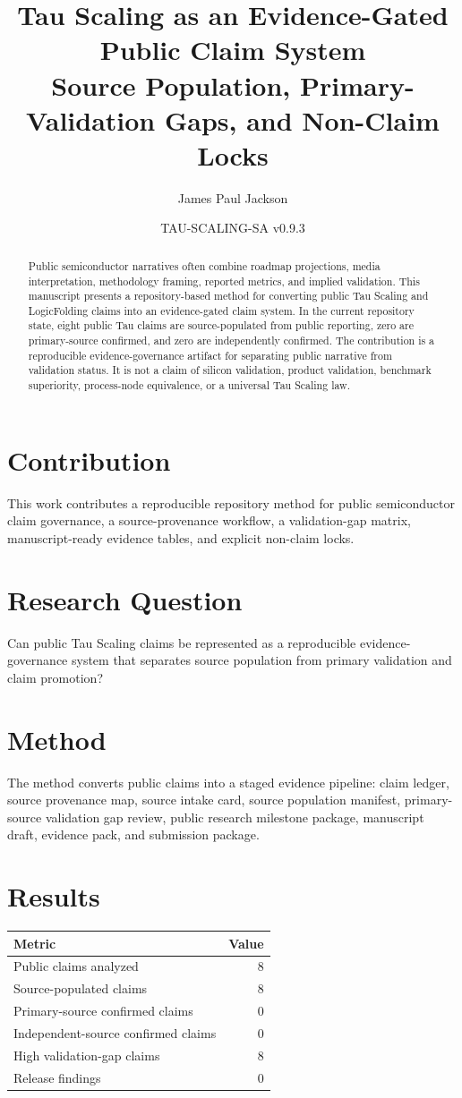 \documentclass[11pt]{article}
\title{Tau Scaling as an Evidence-Gated Public Claim System\\
\large Source Population, Primary-Validation Gaps, and Non-Claim Locks}
\author{James Paul Jackson}
\date{TAU-SCALING-SA v0.9.3}
\begin{document}
\maketitle

\begin{abstract}
Public semiconductor narratives often combine roadmap projections, media interpretation, methodology framing, reported metrics, and implied validation. This manuscript presents a repository-based method for converting public Tau Scaling and LogicFolding claims into an evidence-gated claim system. In the current repository state, eight public Tau claims are source-populated from public reporting, zero are primary-source confirmed, and zero are independently confirmed. The contribution is a reproducible evidence-governance artifact for separating public narrative from validation status. It is not a claim of silicon validation, product validation, benchmark superiority, process-node equivalence, or a universal Tau Scaling law.
\end{abstract}

\section{Contribution}
This work contributes a reproducible repository method for public semiconductor claim governance, a source-provenance workflow, a validation-gap matrix, manuscript-ready evidence tables, and explicit non-claim locks.

\section{Research Question}
Can public Tau Scaling claims be represented as a reproducible evidence-governance system that separates source population from primary validation and claim promotion?

\section{Method}
The method converts public claims into a staged evidence pipeline: claim ledger, source provenance map, source intake card, source population manifest, primary-source validation gap review, public research milestone package, manuscript draft, evidence pack, and submission package.

\section{Results}
\begin{center}
\begin{tabular}{lr}
\toprule
Metric & Value\\
\midrule
Public claims analyzed & 8\\
Source-populated claims & 8\\
Primary-source confirmed claims & 0\\
Independent-source confirmed claims & 0\\
High validation-gap claims & 8\\
Release findings & 0\\
\bottomrule
\end{tabular}
\end{center}
\end{document}
